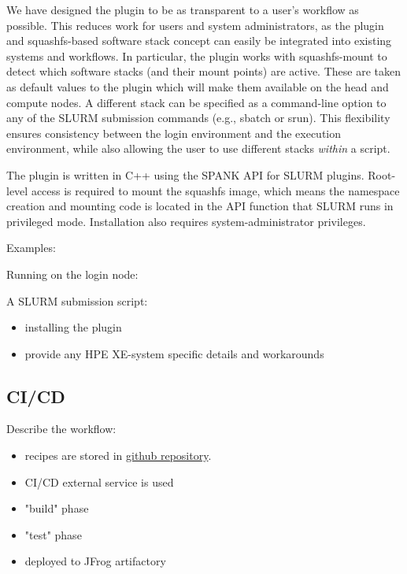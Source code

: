 We have designed the plugin to be as transparent to a user's workflow as possible.
This reduces work for users and system administrators, as the plugin and squashfs-based software stack concept can easily be integrated into existing systems and workflows.
In particular, the plugin works with squashfs-mount to detect which software stacks (and their mount points) are active.
These are taken as default values to the plugin which will make them available on the head and compute nodes.
A different stack can be specified as a command-line option to any of the SLURM submission commands (e.g., sbatch or srun).
This flexibility ensures consistency between the login environment and the execution environment, while also allowing the user to use different stacks \emph{within} a script.

The plugin is written in C++ using the SPANK API for SLURM plugins.
Root-level access is required to mount the squashfs image, which means the namespace creation and mounting code is located in the API function that SLURM runs in privileged mode.
Installation also requires system-administrator privileges.

Examples:

Running on the login node:


A SLURM submission script:


\begin{itemize}
    \item installing the plugin
    \item provide any HPE XE-system specific details and workarounds
\end{itemize}

\subsection{CI/CD}


Describe the workflow:
\begin{itemize}
    \item recipes are stored in \href{https://github.com/eth-cscs/alps-spack-stacks}{github repository}.
    \item CI/CD external service is used
    \item "build" phase
    \item "test" phase
    \item deployed to JFrog artifactory
\end{itemize}

